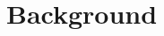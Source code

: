 \documentclass[referee,lineno,pdflatex,sn-vancouver-num]{sn-jnl}
\theoremstyle{thmstyleone}%
\theoremstyle{thmstyletwo}%
\theoremstyle{thmstylethree}%
\begin{document}
\section{Background}\label{sec:intro}
\end{document}
